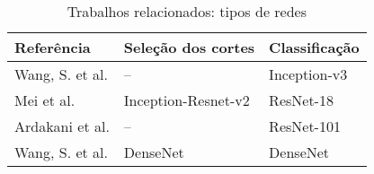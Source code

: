 \begin{table}[ht]
\centering
\caption{Trabalhos relacionados: tipos de redes} 
\label{table:trabalhos_relacionados_tecnicas_utilizadas}
\begin{tabularx}{1.0\textwidth} { 
  >{\hsize=6.5cm\raggedleft\arraybackslash}X 
  >{\raggedright\arraybackslash}X 
  >{\raggedright\arraybackslash}X
 }
 \toprule   
 Referência & 
 Seleção dos cortes & 
 Classificação \\ 
\midrule

Wang, S. et al. \cite{wang2021deep} & 
– & 
Inception-v3

\\

Mei et al. \cite{mei2020artificial} & 
Inception-Resnet-v2 &
ResNet-18


\\

Ardakani et al. \cite{ardakani2020application} & 
– & 
ResNet-101


\\

Wang, S. et al. \cite{wang2020fully} & 
DenseNet & 
DenseNet



\end{tabularx}
\end{table}
